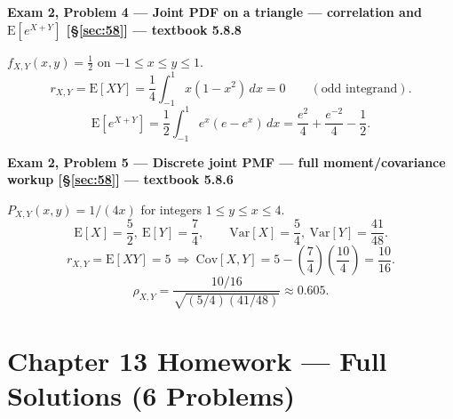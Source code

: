 \documentclass[11pt]{article}
\newcommand{\E}[1]{\mathrm{E}\left[#1\right]}
\newcommand{\Var}[1]{\mathrm{Var}\left[#1\right]}
\newcommand{\Cov}[1]{\mathrm{Cov}\left[#1\right]}
\newcommand{\topline}[1]{\par\vspace{5pt}\noindent{\color{#1}\rule{\linewidth}{1.1pt}}\par\vspace{3pt}}
\newcommand{\botline}[1]{\par\vspace{2pt}\noindent{\color{#1}\rule{\linewidth}{1.1pt}}\par\vspace{8pt}}
\newenvironment{examprob}[2]{%
  \topline{examcol}\noindent\textbf{\color{examcol}#1 --- #2}\par\smallskip\noindent\ignorespaces
}{\botline{examcol}}
\begin{document}
\begin{examprob}{Exam 2, Problem 4}{Joint PDF on a triangle --- correlation and $\E{e^{X+Y}}$ \hfill [\S\ref{sec:58}] --- textbook 5.8.8}
$f_{X,Y}(x,y)=\frac12$ on $-1\le x\le y\le1$.
\[ r_{X,Y}=\E{XY} = \frac14\int_{-1}^1 x(1-x^2)\,dx = \boxed{0} \qquad(\text{odd integrand}). \]
\[ \E{e^{X+Y}} = \frac12\int_{-1}^{1} e^x(e-e^x)\,dx = \boxed{\frac{e^2}{4}+\frac{e^{-2}}{4}-\frac12}. \]
\end{examprob}

\begin{examprob}{Exam 2, Problem 5}{Discrete joint PMF --- full moment/covariance workup \hfill [\S\ref{sec:58}] --- textbook 5.8.6}
$P_{X,Y}(x,y)=1/(4x)$ for integers $1\le y\le x\le4$.
\[ \E{X}=\frac52,\ \E{Y}=\frac74, \qquad \Var{X}=\frac54,\ \Var{Y}=\frac{41}{48}. \]
\[ r_{X,Y}=\E{XY}=5 \ \Longrightarrow\ \Cov{X,Y}=5-\left(\frac74\right)\!\left(\frac{10}4\right)=\frac{10}{16}. \]
\[ \rho_{X,Y} = \frac{10/16}{\sqrt{(5/4)(41/48)}} \approx \boxed{0.605}. \]
\end{examprob}

\clearpage
\section{Chapter 13 Homework --- Full Solutions (6 Problems)}
\end{document}
